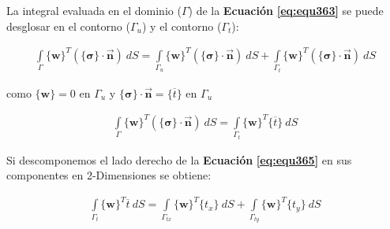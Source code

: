 \bigskip
La integral evaluada en el dominio ($\Gamma$) de la \textbf{Ecuación} \textbf{\ref{eq:equ363}} se puede desglosar en el contorno ($\Gamma_{u}$) y el contorno ($\Gamma_{t}$):

\begin{ceqn} %
\begin{gather}\label{eq:equ364}
\int \limits_\Gamma \{\mathbf{w}\}^T(\{\mathbf{\sigma}\} \cdot \mathbf{\vec{n}})\ dS =
\int \limits_{\Gamma_{u}} \{\mathbf{w}\}^T(\{\mathbf{\sigma}\} \cdot \mathbf{\vec{n}})\ dS +
\int \limits_{\Gamma_{t}} \{\mathbf{w}\}^T(\{\mathbf{\sigma}\} \cdot \mathbf{\vec{n}})\ dS
\end{gather}   
\end{ceqn}

como $\{\mathbf{w}\} = 0$ en $\Gamma_{u}$ y $\{\mathbf{\sigma}\}\cdot \mathbf{\vec{n}} = \{\overline{t}\}$ en $\Gamma_{u}$

\begin{ceqn} %
\begin{gather}\label{eq:equ365}
\int \limits_\Gamma \{\mathbf{w}\}^T(\{\mathbf{\sigma}\} \cdot \mathbf{\vec{n}})\ dS =
\int \limits_{\Gamma_{t}} \{\mathbf{w}\}^T \{\overline{t}\}\ dS
\end{gather}   
\end{ceqn}

\bigskip
Si descomponemos el lado derecho de la \textbf{Ecuación} \textbf{\ref{eq:equ365}} en sus componentes en 2-Dimensiones se obtiene:

\begin{ceqn} %
\begin{gather}\label{eq:equ366}
\int \limits_{\Gamma_{t}} \{\mathbf{w}\}^T \overline{t}\ dS = 
\int \limits_{\Gamma_{tx}} \{\mathbf{w}\}^T \{t_x\}\ dS +
\int \limits_{\Gamma_{ty}} \{\mathbf{w}\}^T \{t_y\}\ dS
\end{gather}   
\end{ceqn}

